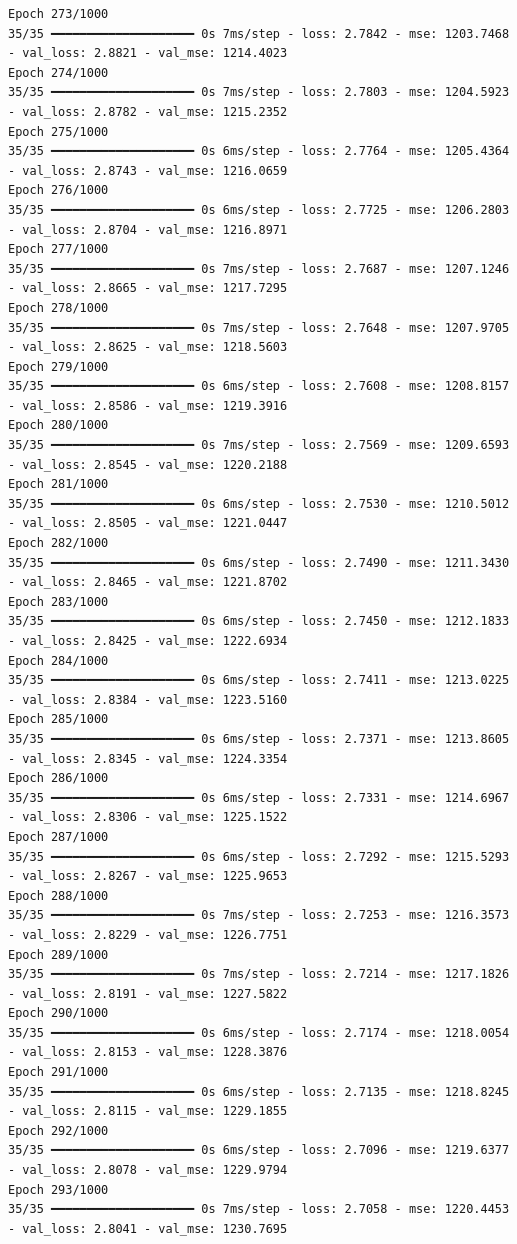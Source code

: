 \documentclass[
  letterpaper,
  DIV=11,
  numbers=noendperiod]{scrreprt}
\begin{document}
\begin{verbatim}
Epoch 273/1000
35/35 ━━━━━━━━━━━━━━━━━━━━ 0s 7ms/step - loss: 2.7842 - mse: 1203.7468 - val_loss: 2.8821 - val_mse: 1214.4023
Epoch 274/1000
35/35 ━━━━━━━━━━━━━━━━━━━━ 0s 7ms/step - loss: 2.7803 - mse: 1204.5923 - val_loss: 2.8782 - val_mse: 1215.2352
Epoch 275/1000
35/35 ━━━━━━━━━━━━━━━━━━━━ 0s 6ms/step - loss: 2.7764 - mse: 1205.4364 - val_loss: 2.8743 - val_mse: 1216.0659
Epoch 276/1000
35/35 ━━━━━━━━━━━━━━━━━━━━ 0s 6ms/step - loss: 2.7725 - mse: 1206.2803 - val_loss: 2.8704 - val_mse: 1216.8971
Epoch 277/1000
35/35 ━━━━━━━━━━━━━━━━━━━━ 0s 7ms/step - loss: 2.7687 - mse: 1207.1246 - val_loss: 2.8665 - val_mse: 1217.7295
Epoch 278/1000
35/35 ━━━━━━━━━━━━━━━━━━━━ 0s 7ms/step - loss: 2.7648 - mse: 1207.9705 - val_loss: 2.8625 - val_mse: 1218.5603
Epoch 279/1000
35/35 ━━━━━━━━━━━━━━━━━━━━ 0s 6ms/step - loss: 2.7608 - mse: 1208.8157 - val_loss: 2.8586 - val_mse: 1219.3916
Epoch 280/1000
35/35 ━━━━━━━━━━━━━━━━━━━━ 0s 7ms/step - loss: 2.7569 - mse: 1209.6593 - val_loss: 2.8545 - val_mse: 1220.2188
Epoch 281/1000
35/35 ━━━━━━━━━━━━━━━━━━━━ 0s 6ms/step - loss: 2.7530 - mse: 1210.5012 - val_loss: 2.8505 - val_mse: 1221.0447
Epoch 282/1000
35/35 ━━━━━━━━━━━━━━━━━━━━ 0s 6ms/step - loss: 2.7490 - mse: 1211.3430 - val_loss: 2.8465 - val_mse: 1221.8702
Epoch 283/1000
35/35 ━━━━━━━━━━━━━━━━━━━━ 0s 6ms/step - loss: 2.7450 - mse: 1212.1833 - val_loss: 2.8425 - val_mse: 1222.6934
Epoch 284/1000
35/35 ━━━━━━━━━━━━━━━━━━━━ 0s 6ms/step - loss: 2.7411 - mse: 1213.0225 - val_loss: 2.8384 - val_mse: 1223.5160
Epoch 285/1000
35/35 ━━━━━━━━━━━━━━━━━━━━ 0s 6ms/step - loss: 2.7371 - mse: 1213.8605 - val_loss: 2.8345 - val_mse: 1224.3354
Epoch 286/1000
35/35 ━━━━━━━━━━━━━━━━━━━━ 0s 6ms/step - loss: 2.7331 - mse: 1214.6967 - val_loss: 2.8306 - val_mse: 1225.1522
Epoch 287/1000
35/35 ━━━━━━━━━━━━━━━━━━━━ 0s 6ms/step - loss: 2.7292 - mse: 1215.5293 - val_loss: 2.8267 - val_mse: 1225.9653
Epoch 288/1000
35/35 ━━━━━━━━━━━━━━━━━━━━ 0s 7ms/step - loss: 2.7253 - mse: 1216.3573 - val_loss: 2.8229 - val_mse: 1226.7751
Epoch 289/1000
35/35 ━━━━━━━━━━━━━━━━━━━━ 0s 7ms/step - loss: 2.7214 - mse: 1217.1826 - val_loss: 2.8191 - val_mse: 1227.5822
Epoch 290/1000
35/35 ━━━━━━━━━━━━━━━━━━━━ 0s 6ms/step - loss: 2.7174 - mse: 1218.0054 - val_loss: 2.8153 - val_mse: 1228.3876
Epoch 291/1000
35/35 ━━━━━━━━━━━━━━━━━━━━ 0s 6ms/step - loss: 2.7135 - mse: 1218.8245 - val_loss: 2.8115 - val_mse: 1229.1855
Epoch 292/1000
35/35 ━━━━━━━━━━━━━━━━━━━━ 0s 6ms/step - loss: 2.7096 - mse: 1219.6377 - val_loss: 2.8078 - val_mse: 1229.9794
Epoch 293/1000
35/35 ━━━━━━━━━━━━━━━━━━━━ 0s 7ms/step - loss: 2.7058 - mse: 1220.4453 - val_loss: 2.8041 - val_mse: 1230.7695

\end{verbatim}
\end{document}

